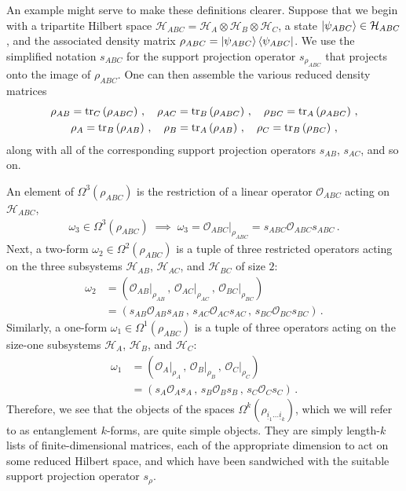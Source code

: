 \documentclass[12pt]{article}
\newcommand{\ul}[1]{{\underline{#1}}}
\numberwithin{equation}{section}
\begin{document}
An example might serve to make these definitions clearer. Suppose that we begin with a tripartite Hilbert space $\mathcal{H}_{ABC} = \mathcal{H}_A \otimes \mathcal{H}_B \otimes \mathcal{H}_C$, a state $\ket{\psi_{ABC}} \in \mathcal{H}_{ABC}$, and the associated density matrix $\rho_{ABC} = \ket{\psi_{ABC}} \bra{\psi_{ABC}}$. We use the simplified notation $s_{ABC}$ for the support projection operator $s_{\rho_{ABC}}$ that projects onto the image of $\rho_{ABC}$. One can then assemble the various reduced density matrices
%
\begin{gather}
    \rho_{AB} = \tr_C \left( \rho_{ABC} \right) \, , \quad \rho_{AC} = \tr_B \left( \rho_{ABC} \right) \, , \quad \rho_{BC} = \tr_A \left( \rho_{ABC} \right) \, , \nonumber \\
    \rho_A = \tr_B \left( \rho_{AB} \right) \, , \quad \rho_B = \tr_A \left( \rho_{AB} \right) \, , \quad \rho_C = \tr_B \left( \rho_{BC} \right) \, , \label{tripartite_reductions}
\end{gather}
%
along with all of the corresponding support projection operators $s_{AB}$, $s_{AC}$, and so on.

An element of $\Omega^3 ( \rho_{ABC} )$ is the restriction of a linear operator $\mathcal{O}_{ABC}$ acting on $\mathcal{H}_{ABC}$,
%
\begin{align}
    \omega_3 \in \Omega^3 ( \rho_{ABC} ) \; \implies \; \omega_3 = \mathcal{O}_{ABC} \big\vert_{\rho_{ABC}} = s_{ABC} \mathcal{O}_{ABC} s_{ABC} \, .
\end{align}
%
Next, a two-form $\omega_2 \in \Omega^2 ( \rho_{ABC} )$ is a tuple of three restricted operators acting on the three subsystems $\mathcal{H}_{AB}$, $\mathcal{H}_{AC}$, and $\mathcal{H}_{BC}$ of size $2$:
%
\begin{align}
    \omega_2 &= \left( \mathcal{O}_{AB} \big\vert_{\rho_{AB}} \, , \, \mathcal{O}_{AC} \big\vert_{\rho_{AC}} \, , \, \mathcal{O}_{BC} \big\vert_{\rho_{BC}} \right) \nonumber \\
    &= \left( s_{AB} \mathcal{O}_{AB} s_{AB} \, , \, s_{AC} \mathcal{O}_{AC} s_{AC} \, , \, s_{BC} \mathcal{O}_{BC} s_{BC} \right) \, .
\end{align}
%
Similarly, a one-form $\omega_1 \in \Omega^1 ( \rho_{ABC} )$ is a tuple of three operators acting on the size-one subsystems $\mathcal{H}_A$, $\mathcal{H}_B$, and $\mathcal{H}_C$:
%
\begin{align}
    \omega_1 &= \left( \mathcal{O}_{A} \big\vert_{\rho_{A}} \, , \, \mathcal{O}_{B} \big\vert_{\rho_{B}} \, , \, \mathcal{O}_{C} \big\vert_{\rho_{C}} \right) \nonumber \\
    &= \left( s_{A} \mathcal{O}_{A} s_{A} \, , \, s_{B} \mathcal{O}_{B} s_{B} \, , \, s_{C} \mathcal{O}_{C} s_{C} \right) \, .
\end{align}
%
Therefore, we see that the objects of the spaces $\Omega^k \left( \rho_{\ul{i}_1 \ldots \ul{i}_k} \right)$, which we will refer to as entanglement $k$-forms, are quite simple objects. They are simply length-$k$ lists of finite-dimensional matrices, each of the appropriate dimension to act on some reduced Hilbert space, and which have been sandwiched with the suitable support projection operator $s_\rho$.
\end{document}
